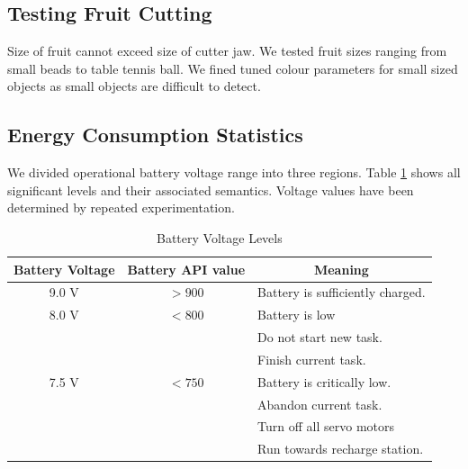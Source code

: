 \documentclass[a4paper, 12pt]{article}
\begin{document}
 \subsection{Testing Fruit Cutting}
 Size of fruit cannot exceed size of cutter jaw. We tested fruit sizes ranging from small beads to table tennis ball.
 We fined tuned colour parameters for small sized objects as small objects are difficult to detect.
 
 \subsection{Energy Consumption Statistics}
 We divided operational battery voltage range into three regions. Table \ref{table-battery} shows all significant
 levels and their associated semantics. Voltage values have been determined by repeated experimentation.
 \begin{table}
  \centering
  \begin{tabular}{|c|c|l|}
  \hline 
  \multicolumn{1}{|c|}{\textbf{Battery Voltage}} & \multicolumn{1}{|c|}{\textbf{Battery API value}} & 
  \multicolumn{1}{|c|}{\textbf{Meaning}}\\
  \hline
  \hline
  9.0 V & $> 900$ & Battery is sufficiently charged.\\
  \hline
  8.0 V & $< 800$ & Battery is low\\
  & & Do not start new task.\\
  & & Finish current task.\\
  \hline
  7.5 V & $< 750$ &  Battery is critically low.\\
  & & Abandon current task.\\
  & & Turn off all servo motors\\
  & & Run towards recharge station.\\
  \hline
  \end{tabular}
  \caption{Battery Voltage Levels}
  \label{table-battery}
 \end{table}
 
\end{document}
